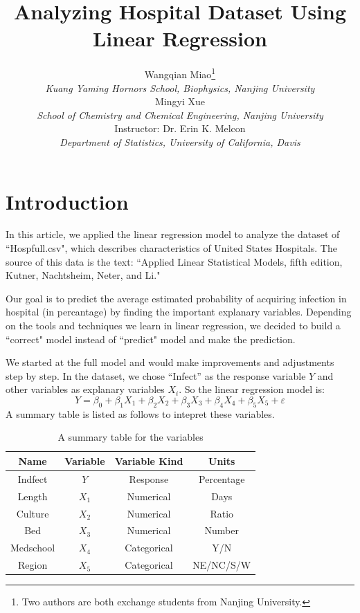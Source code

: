 \documentclass[a4paper,11pt,onecolumn,twoside]{article}
\title{\Large \textbf{Analyzing Hospital Dataset Using Linear Regression }}
\author{
Wangqian Miao\footnote{Two authors are both exchange students from Nanjing University.}
\\[2pt]
{\large \textit{Kuang Yaming Hornors School, Biophysics, Nanjing University}}\\[6pt]
Mingyi Xue\\[2pt]
{\large \textit{School of Chemistry and Chemical Engineering, Nanjing University}}\\[6pt]
Instructor: Dr. Erin K. Melcon\\[2pt]
{\large \textit{Department of Statistics, University of California, Davis}}\\[2pt]
}
\date{}
\begin{document}
\maketitle
\thispagestyle{firststyle}
\setlength{\oddsidemargin}{ 1cm}
\setlength{\evensidemargin}{\oddsidemargin}
\setlength{\textwidth}{15.50cm}
\vspace{-.8cm}
\setcounter{page}{1}
\setlength{\oddsidemargin}{-.5cm}  %
\setlength{\evensidemargin}{\oddsidemargin}
\setlength{\textwidth}{17.00cm}
\tableofcontents
\newpage
\section{Introduction}
In this article, we applied the linear regression model to analyze the dataset of ``Hospfull.csv", which describes characteristics of United States Hospitals.
The source of this data is the text: ``Applied Linear Statistical Models, fifth edition, Kutner, Nachtsheim, Neter,
and Li."\par
Our goal is to predict the average estimated probability of acquiring infection in hospital (in percantage) by finding the important explanary variables. Depending on the tools and techniques we learn in linear regression, we decided to build a ``correct" model instead of ``predict" model and make the prediction. \par
We started at the full model and would make improvements and adjustments step by step. In the dataset,
we chose ``Infect'' as the response variable $Y$ and other variables as explanary variables $X_i$. So the linear regression model is:
\begin{equation}
Y=\beta_0+\beta_1X_1+\beta_2X_2+\beta_3X_3+\beta_4X_4+\beta_5X_5+\varepsilon
\end{equation}
A summary table is listed as follows to intepret these variables. 
 \begin{table}[htbp]
 	\centering
 	\begin{tabular}{cccc}
 		\midrule[1.5pt]
 		Name& Variable &Variable Kind  & Units\\
 		\hline
 		Indfect&$Y$ & Response  & Percentage\\
 	    Length& $X_1$& Numerical  & Days  \\
 		 Culture& $X_2$ &Numerical & Ratio \\
 		 Bed& $X_3$ & Numerical& Number \\
 		 Medschool&$X_4$& Categorical  & Y/N \\
 		Region& $X_5$& Categorical  & NE/NC/S/W \\
 		\midrule[1.5pt]
 	\end{tabular}
 	\caption{A summary table for the variables }
 \end{table}
\end{document}
